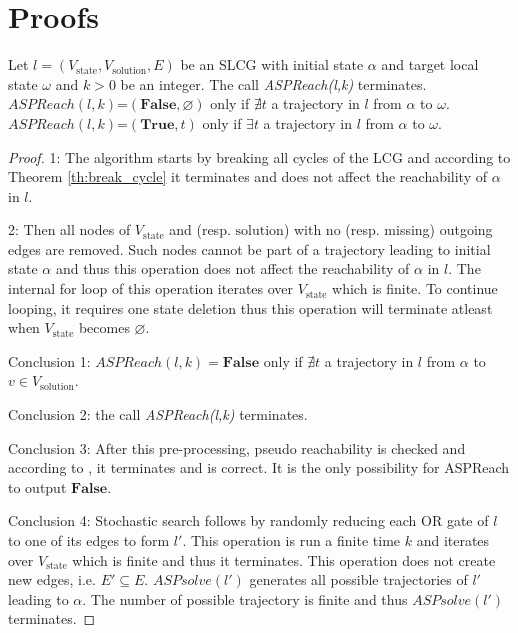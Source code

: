 \chapter{Proofs}\label{sec:proof}
\begin{theorem}
    
    Let $l=(V_{\mathrm{state}}, V_{\mathrm{solution}}, E)$ be an SLCG with initial state $\alpha$ and target local state $\omega$ and $k > 0$ be an integer.
    The call \textit{ASPReach(l,k)} terminates.\\
    $ASPReach(l,k)$=$(\mathbf{False},\varnothing)$ only if $\nexists t$ a trajectory in $l$ from $\alpha$ to $\omega$.\\
    $ASPReach(l,k)$=$(\mathbf{True},t)$ only if $\exists t$ a trajectory in $l$ from $\alpha$ to $\omega$.
    \begin{proof}
    
        1: The algorithm starts by breaking all cycles of the LCG and according to Theorem \ref{th:break_cycle} it terminates and does not affect the reachability of $\alpha$ in $l$.
        
        2: Then all nodes of $V_{\mathrm{state}}$ and (resp. ${\mathrm{solution}}$) with no (resp. missing) outgoing edges are removed.
        Such nodes cannot be part of a trajectory leading to initial state $\alpha$ and thus this operation does not affect the reachability of $\alpha$ in $l$.
        The internal for loop of this operation iterates over $V_{\mathrm{state}}$ which is finite.
        To continue looping, it requires one state deletion thus this operation will terminate atleast when $V_{\mathrm{state}}$ becomes $\varnothing$.
        
        Conclusion 1: $ASPReach(l,k)=\mathbf{False}$ only if $\nexists t$ a trajectory in $l$ from $\alpha$ to $v \in V_{\mathrm{solution}}$.
        
        Conclusion 2: the call \textit{ASPReach(l,k)} terminates.
        
        Conclusion 3: After this pre-processing, pseudo reachability is checked and according to \cite{pauleve2012}, it terminates and is correct.
        It is the only possibility for ASPReach to output $\mathbf{False}$.
        
        Conclusion 4: Stochastic search follows by randomly reducing each OR gate of $l$ to one of its edges to form $l'$.
        This operation is run a finite time $k$ and iterates over $V_{\mathrm{state}}$ which is finite and thus it terminates.
        This operation does not create new edges, i.e. $E' \subseteq E$.
        $ASPsolve(l')$ generates all possible trajectories of $l'$ leading to $\alpha$.
        The number of possible trajectory is finite and thus $ASPsolve(l')$ terminates.
        

\end{proof}
\end{theorem}
